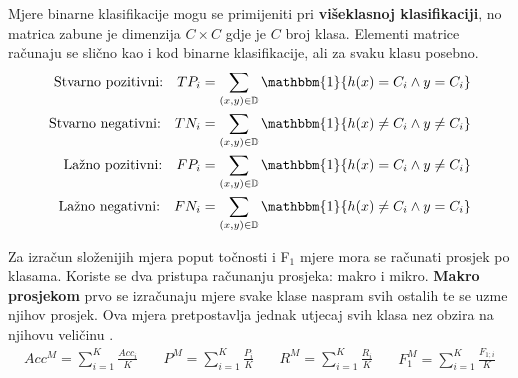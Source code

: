 \documentclass[times, utf8, numeric, diplomski]{fer}
\def\F1{F$_1$}
\begin{document}
%

Mjere binarne klasifikacije mogu se primijeniti pri \textbf{višeklasnoj klasifikaciji}, no matrica zabune je dimenzija $C\times C$ gdje je $C$ broj klasa. Elementi matrice računaju se slično kao i kod binarne klasifikacije, ali za svaku klasu posebno.
\begin{align}
\label{eq:true_groups}
\begin{split}
\text{Stvarno pozitivni:} \quad TP_i &= \sum_{(x,y)\in\mathbb{D}} \mathbbm{1} \{h(x) =  C_i \wedge y = C_i \} \\
\text{Stvarno negativni:} \quad TN_i &= \sum_{(x,y)\in\mathbb{D}} \mathbbm{1} \{h(x) \neq C_i \wedge y \neq C_i \} \\
\text{Lažno pozitivni:} \quad FP_i &= \sum_{(x,y)\in\mathbb{D}} \mathbbm{1} \{h(x) = C_i \wedge y \neq C_i \} \\
\text{Lažno negativni:} \quad FN_i &= \sum_{(x,y)\in\mathbb{D}} \mathbbm{1} \{h(x) \neq C_i \wedge y = C_i \}
\end{split}
\end{align}

Za izračun složenijih mjera poput točnosti i \F1 mjere mora se računati prosjek po klasama. Koriste se dva pristupa računanju prosjeka: makro i mikro. \textbf{Makro prosjekom} prvo se izračunaju mjere svake klase naspram svih ostalih te se uzme njihov prosjek. Ova mjera pretpostavlja jednak utjecaj svih klasa nez obzira na njihovu veličinu \citep{ml_probabilistic}.
\begin{equation}
\begin{split}
Acc^M = \sum_{i=1}^K \frac{Acc_i}{K}
\end{split} \quad
\begin{split}
P^M = \sum_{i=1}^K \frac{P_i}{K}
\end{split} \quad
\begin{split}
R^M = \sum_{i=1}^K \frac{R_i}{K}
\end{split} \quad
\begin{split}
F_1^M = \sum_{i=1}^K \frac{F_{1;i}}{K}
\end{split}
\end{equation}
\end{document}
